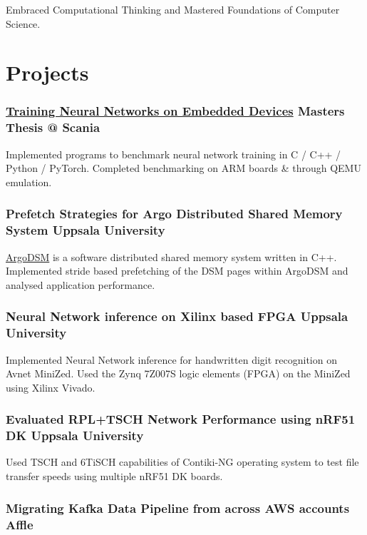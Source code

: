\documentclass[12pt]{scrartcl}
\newcommand{\hll}[1]{{\color{RawSienna}#1}}
\newcommand{\hlp}[1]{{\color{Maroon}#1}}
\begin{document}
Embraced Computational Thinking and Mastered Foundations of Computer Science.

\section{Projects}

\subsubsection[Benchmarking ANNs]{\href{https://github.com/paperbound/hdrnn-arm}{Training Neural Networks on Embedded Devices} \hfill Masters Thesis @ Scania}

Implemented programs to benchmark neural network training in \hll{C} / \hll{C++} / \hll{Python} / \hlp{PyTorch}. Completed benchmarking on \hlp{ARM} boards \& through \hlp{QEMU} emulation.

\subsubsection[Argo DSM]{Prefetch Strategies for Argo Distributed Shared Memory System \hfill Uppsala University}

\href{https://github.com/etascale/argodsm}{ArgoDSM} is a software distributed shared memory system written in \hll{C++}. Implemented stride based prefetching of the DSM pages within ArgoDSM and analysed application performance.

\subsubsection[Xilinx FPGA NN Inference]{Neural Network inference on Xilinx based FPGA \hfill Uppsala University}

Implemented Neural Network inference for handwritten digit recognition on Avnet MiniZed. Used the \hlp{Zynq 7Z007S} logic elements (FPGA) on the MiniZed using Xilinx \hlp{Vivado}.

\subsubsection[WCNES NRF51]{Evaluated RPL+TSCH Network Performance using nRF51 DK \hfill Uppsala University}

Used TSCH and 6TiSCH capabilities of Contiki-NG operating system to test file transfer speeds using multiple nRF51 DK boards.

\subsubsection[Kafka Migration]{Migrating Kafka Data Pipeline from across AWS accounts \hfill Affle}
\end{document}
